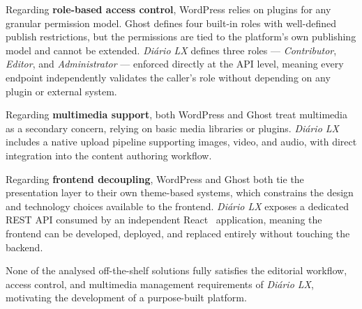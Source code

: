 Regarding \textbf{role-based access control}, WordPress relies on plugins for any
granular permission model. Ghost defines four built-in roles with well-defined publish
restrictions, but the permissions are tied to the platform's own publishing model and
cannot be extended. \textit{Diário LX} defines three roles --- \textit{Contributor},
\textit{Editor}, and \textit{Administrator} --- enforced directly at the API level,
meaning every endpoint independently validates the caller's role without depending on
any plugin or external system.

Regarding \textbf{multimedia support}, both WordPress and Ghost treat multimedia as
a secondary concern, relying on basic media libraries or plugins. \textit{Diário LX} includes
a native upload pipeline supporting images, video, and audio, with direct integration
into the content authoring workflow.

Regarding \textbf{frontend decoupling}, WordPress and Ghost both tie the presentation
layer to their own theme-based systems, which constrains the design and technology choices
available to the frontend. \textit{Diário LX} exposes a dedicated REST API consumed by an
independent React~\cite{react_docs} application, meaning the frontend can be developed, deployed, and
replaced entirely without touching the backend.

None of the analysed off-the-shelf solutions fully satisfies the editorial workflow,
access control, and multimedia management requirements of \textit{Diário LX}, motivating the
development of a purpose-built platform.